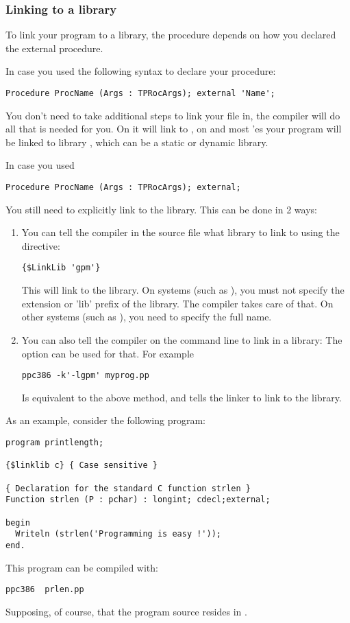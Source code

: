 \subsubsection{Linking to a library}
\label{se:LinkOut}

To link your program to a library, the procedure depends on how you declared
the external procedure.

In case you used the following syntax to declare your procedure:
\begin{verbatim}
Procedure ProcName (Args : TPRocArgs); external 'Name';
\end{verbatim}
You don't need to take additional steps to link your file in, the compiler
will do all that is needed for you. On \windows it will link to
, on \linux and most \unix'es your program will be linked to library
, which can be a static or dynamic library.

In case you used
\begin{verbatim}
Procedure ProcName (Args : TPRocArgs); external;
\end{verbatim}
You still need to explicitly link to the library. This can be done in 2 ways:
\begin{enumerate}
\item You can tell the compiler in the source file what library to link to
using the  directive:
\begin{verbatim}
{$LinkLib 'gpm'}
\end{verbatim}
This will link to the  library. On \unix systems (such as \linux),
you must not specify the extension or 'lib' prefix of the library. The compiler takes
care of that. On other systems (such as \windows ), you need to specify the full
name.
\item You can also tell the compiler on the command line to link in a
library: The  option can be used for that. For example
\begin{verbatim}
ppc386 -k'-lgpm' myprog.pp
\end{verbatim}
Is equivalent to the above method, and tells the linker to link to the
 library.
\end{enumerate}

As an example, consider the following program:
\begin{verbatim}
program printlength;

{$linklib c} { Case sensitive }

{ Declaration for the standard C function strlen }
Function strlen (P : pchar) : longint; cdecl;external;

begin
  Writeln (strlen('Programming is easy !'));
end.
\end{verbatim}
This program can be compiled with:
\begin{verbatim}
ppc386  prlen.pp
\end{verbatim}
Supposing, of course, that the program source resides in .

